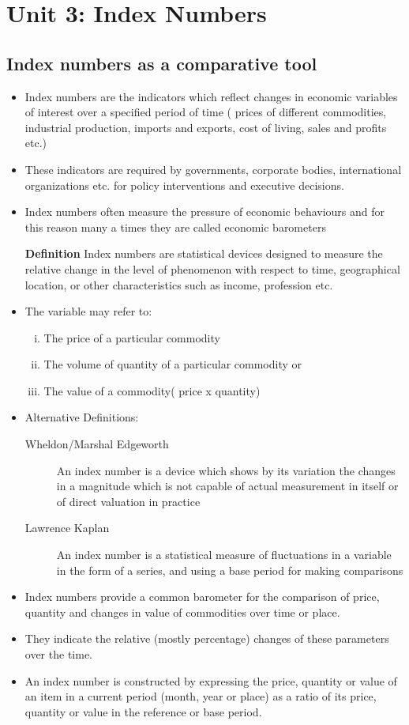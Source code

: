 \documentclass[
10pt, %
a4paper, %
]{report}
\begin{document}
\chapter{Unit 3: Index Numbers}

\section{Index numbers as a comparative tool}
\begin{itemize}
\item Index numbers are the indicators which reflect changes in economic variables of interest over a specified period of time ( prices of different commodities, industrial production, imports and exports, cost of living, sales and profits etc.)
\item These indicators are required by governments, corporate bodies, international organizations etc. for policy interventions and executive decisions.
\item Index numbers often measure the pressure of economic behaviours and for this reason many a times they are called economic barometers
\item[\textbf{Definition}] Index numbers are statistical devices designed to measure the relative change in the level of phenomenon with respect to time, geographical location, or other characteristics such as income, profession etc.
\item The variable may refer to:
\begin{enumerate}[i.]
\item The price of a particular commodity
\item The volume of quantity of a particular commodity or
\item The value of a commodity( price x quantity)
\end{enumerate}
\item Alternative Definitions:
\begin{description}
\item[Wheldon/Marshal Edgeworth] An index number is a device which shows by its variation the changes in a magnitude which is not capable of actual measurement in itself or of direct valuation in practice
\item[Lawrence Kaplan] An index number is a statistical measure of fluctuations in a variable in the form of a series, and using a base period for making comparisons
\end{description}
\item Index numbers provide a common barometer for the comparison of price, quantity and changes in value of commodities over time or place.
\item They indicate the relative (mostly percentage) changes of these parameters over the time.
\item An index number is constructed by expressing the price, quantity or value of an item in a current period (month, year or place) as a ratio of its price, quantity or value in the reference or base period.
\end{itemize}
\end{document}
